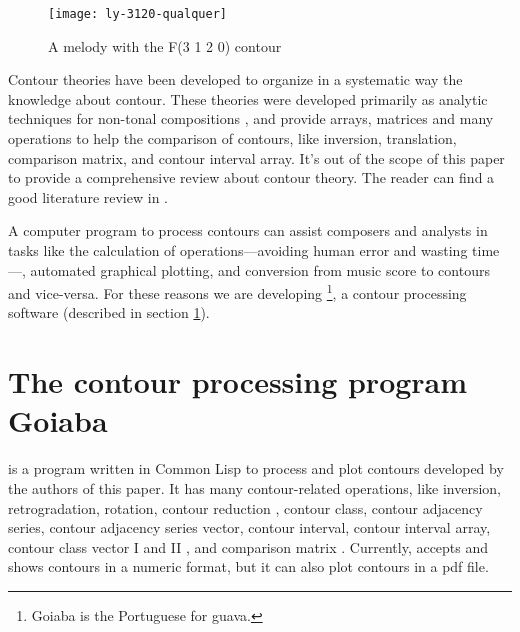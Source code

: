 \begin{figure}[h!]
  \centering
  \texttt{[image: ly-3120-qualquer]}
  \caption{A melody with the F(3 1 2 0) contour}
  \label{fig:ly-3120}
\end{figure}

Contour theories
\cite{friedmann85:methodology,friedmann87:response,morris87:composition,morris93:directions,marvin.ea87:relating,marvin88:generalized,marvin.ea95:generalization,polansky.ea92:possible,quinn97:fuzzy,clifford95:contour,beard03:contour}
have been developed to organize in a systematic way the knowledge
about contour. These theories were developed primarily as analytic
techniques for non-tonal compositions \cite{beard03:contour}, and
provide arrays, matrices and many operations to help the comparison of
contours, like inversion, translation, comparison matrix, and contour
interval array. It's out of the scope of this paper to provide a
comprehensive review about contour theory. The reader can find a good
literature review in \cite{beard03:contour}.

A computer program to process contours can assist composers and
analysts in tasks like the calculation of operations---avoiding human
error and wasting time---, automated graphical plotting, and
conversion from music score to contours and vice-versa. For these
reasons we are developing \goiaba{}\footnote{Goiaba is the Portuguese
  for guava.}, a contour processing software (described in section
\ref{sec:goiaba}).

\section{The contour processing program Goiaba}
\label{sec:goiaba}

\goiaba{} is a program written in Common Lisp
\cite{graham94:lisp,team07:sbcl} to process and plot contours
developed by the authors of this paper. It has many contour-related
operations, like inversion, retrogradation, rotation, contour
reduction \cite{adams76:melodic}, contour class, contour adjacency
series, contour adjacency series vector, contour interval, contour
interval array, contour class vector I and II
\cite{friedmann85:methodology}, and comparison matrix
\cite{morris93:directions}. Currently, \goiaba{} accepts and shows
contours in a numeric format, but it can also plot contours in a pdf
file.

